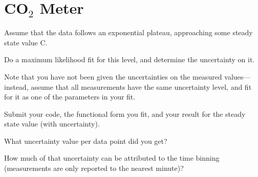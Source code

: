 \section{\texorpdfstring{CO$_2$}{CO2} Meter}

Assume that the data follows an exponential plateau, approaching some steady state value C.

Do a maximum likelihood fit for this level, and determine the uncertainty on it.




Note that you have not been given the uncertainties on the measured values---instead, assume that all measurements have the same uncertainty level, and fit for it as one of the parameters in your fit.

Submit your code, the functional form you fit, and your result for the steady state value (with uncertainty).

What uncertainty value per data point did you get?

How much of that uncertainty can be attributed to the time binning (measurements are only reported to the nearest minute)?
